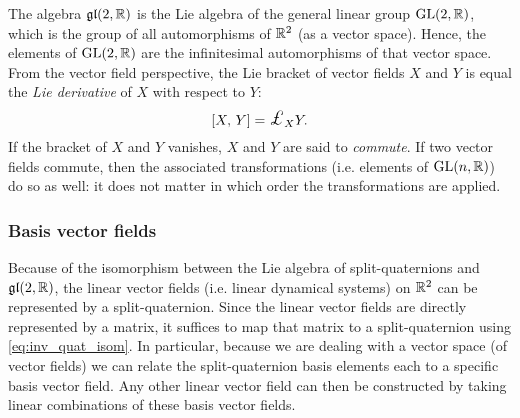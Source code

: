 The algebra $\mathfrak{gl}(2, \mathbb{R})$ is the Lie algebra of the general linear group $\mathrm{GL}(2, \mathbb{R})$, which is the group of all automorphisms of $\mathbb{R}^2$ (as a vector space). Hence, the elements of $\mathrm{GL}(2, \mathbb{R})$ are the infinitesimal automorphisms of that vector space. From the vector field perspective, the Lie bracket of vector fields $X$ and $Y$ is equal the \emph{Lie derivative} of $X$ with respect to $Y$:
\begin{equation}
    \liebr{X}{Y} = \lied{X}{Y}.
\end{equation}
If the bracket of $X$ and $Y$ vanishes, $X$ and $Y$ are said to \emph{commute}. If two vector fields commute, then the associated transformations (i.e. elements of $\mathrm{GL}(n, \mathbb{R})$) do so as well: it does not matter in which order the transformations are applied.


\subsubsection{Basis vector fields}
Because of the isomorphism between the Lie algebra of split-quaternions and $\mathfrak{gl}(2, \mathbb{R})$, the linear vector fields (i.e. linear dynamical systems) on $\mathbb{R}^2$ can be represented by a split-quaternion. Since the linear vector fields are directly represented by a matrix, it suffices to map that matrix to a split-quaternion using \cref{eq:inv_quat_isom}. In particular, because we are dealing with a vector space (of vector fields) we can relate the split-quaternion basis elements each to a specific basis vector field. Any other linear vector field can then be constructed by taking linear combinations of these basis vector fields. 

